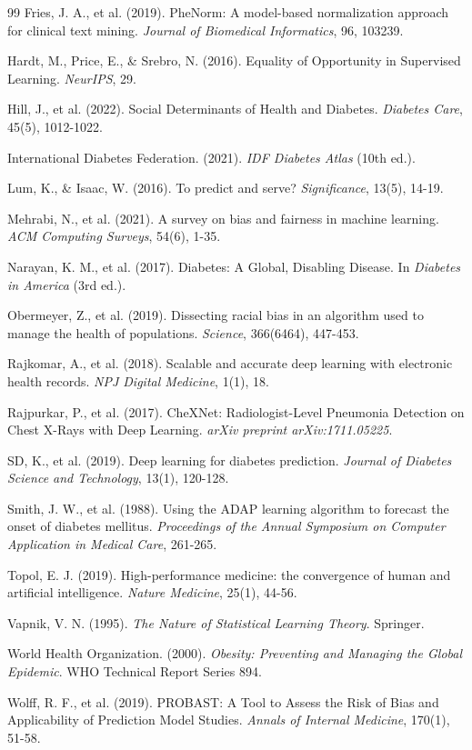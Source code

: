 \documentclass[12pt,a4paper]{article}
\begin{document}
\begin{thebibliography}{99}
Fries, J. A., et al. (2019). PheNorm: A model-based normalization approach 
for clinical text mining. \textit{Journal of Biomedical Informatics}, 96, 
103239.

Hardt, M., Price, E., \& Srebro, N. (2016). Equality of Opportunity in 
Supervised Learning. \textit{NeurIPS}, 29.

Hill, J., et al. (2022). Social Determinants of Health and Diabetes. 
\textit{Diabetes Care}, 45(5), 1012-1022.

International Diabetes Federation. (2021). \textit{IDF Diabetes Atlas} 
(10th ed.).

Lum, K., \& Isaac, W. (2016). To predict and serve? \textit{Significance}, 
13(5), 14-19.

Mehrabi, N., et al. (2021). A survey on bias and fairness in machine learning. 
\textit{ACM Computing Surveys}, 54(6), 1-35.

Narayan, K. M., et al. (2017). Diabetes: A Global, Disabling Disease. In 
\textit{Diabetes in America} (3rd ed.).

Obermeyer, Z., et al. (2019). Dissecting racial bias in an algorithm used to 
manage the health of populations. \textit{Science}, 366(6464), 447-453.

Rajkomar, A., et al. (2018). Scalable and accurate deep learning with 
electronic health records. \textit{NPJ Digital Medicine}, 1(1), 18.

Rajpurkar, P., et al. (2017). CheXNet: Radiologist-Level Pneumonia Detection 
on Chest X-Rays with Deep Learning. \textit{arXiv preprint 
arXiv:1711.05225}.

SD, K., et al. (2019). Deep learning for diabetes prediction. 
\textit{Journal of Diabetes Science and Technology}, 13(1), 120-128.

Smith, J. W., et al. (1988). Using the ADAP learning algorithm to forecast 
the onset of diabetes mellitus. \textit{Proceedings of the Annual Symposium 
on Computer Application in Medical Care}, 261-265.

Topol, E. J. (2019). High-performance medicine: the convergence of human and 
artificial intelligence. \textit{Nature Medicine}, 25(1), 44-56.

Vapnik, V. N. (1995). \textit{The Nature of Statistical Learning Theory}. 
Springer.

World Health Organization. (2000). \textit{Obesity: Preventing and Managing 
the Global Epidemic}. WHO Technical Report Series 894.

Wolff, R. F., et al. (2019). PROBAST: A Tool to Assess the Risk of Bias 
and Applicability of Prediction Model Studies. \textit{Annals of Internal 
Medicine}, 170(1), 51-58.

\end{thebibliography}
\end{document}
